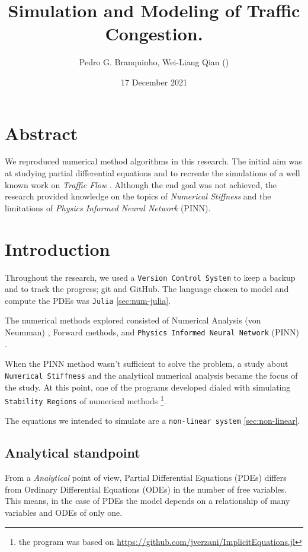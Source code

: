\documentclass[12pt]{article}
\author{Pedro G. Branquinho, Wei-Liang Qian (\ch{钱卫良})}
\date{17 December 2021}
\title{Simulation and Modeling of Traffic Congestion.}
\begin{document}
\maketitle
\tableofcontents

\clearpage
\section{Abstract}
\label{sec:org0433570}

We reproduced numerical method algorithms in this research. The initial
aim was at studying partial differential equations and to
recreate the simulations of a well known work on \emph{Traffic Flow} \cite{kerner1993}. Although the end goal was not achieved, the
research provided knowledge on the topics of \emph{Numerical Stiffness} and
the limitations of \emph{Physics Informed Neural Network} (PINN).

\section{Introduction}
\label{sec:orga5bbc5f}

Throughout the research, we used a \texttt{Version Control System} to keep a backup and
to track the progress; git and GitHub. The language chosen to model and compute
the PDEs was \texttt{Julia} \ref{sec:num-julia}.

The numerical methods explored consisted of Numerical
Analysis (von Neumman) \cite{press1986numerical}, Forward methods, and \texttt{Physics
Informed Neural Network} (PINN) \cite{zubov2021neuralpde}.

When the PINN method wasn't sufficient to solve the problem, a study about
\texttt{Numerical Stiffness} and the analytical numerical analysis became the focus of
the study. At this point, one of the programs developed dialed with simulating
\texttt{Stability Regions} of numerical methods \footnote{the program was based on \url{https://github.com/jverzani/ImplicitEquations.jl}}.

The equations we intended to simulate are a \texttt{non-linear system} \ref{sec:non-linear}.

\subsection{Analytical standpoint}
\label{sec:org5f3a230}
From a \emph{Analytical} point of view, Partial Differential Equations
(PDEs) differs from Ordinary Differential Equations (ODEs) in the
number of free variables. This means, in the case of PDEs the model depends on a
relationship of many variables and ODEs of only one.
\end{document}
